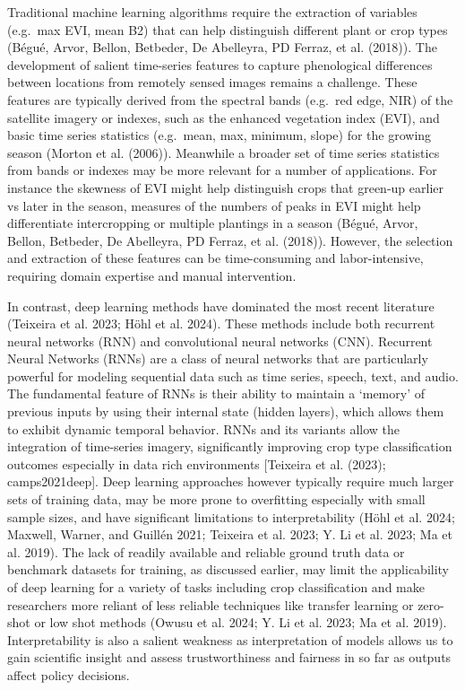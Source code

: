\documentclass[
]{article}
\begin{document}
Traditional machine learning algorithms require the extraction of
variables (e.g.~max EVI, mean B2) that can help distinguish different
plant or crop types (Bégué, Arvor, Bellon, Betbeder, De Abelleyra, PD
Ferraz, et al. (2018)). The development of salient time-series features
to capture phenological differences between locations from remotely
sensed images remains a challenge. These features are typically derived
from the spectral bands (e.g.~red edge, NIR) of the satellite imagery or
indexes, such as the enhanced vegetation index (EVI), and basic time
series statistics (e.g.~mean, max, minimum, slope) for the growing
season (Morton et al. (2006)). Meanwhile a broader set of time series
statistics from bands or indexes may be more relevant for a number of
applications. For instance the skewness of EVI might help distinguish
crops that green-up earlier vs later in the season, measures of the
numbers of peaks in EVI might help differentiate intercropping or
multiple plantings in a season (Bégué, Arvor, Bellon, Betbeder, De
Abelleyra, PD Ferraz, et al. (2018)). However, the selection and
extraction of these features can be time-consuming and labor-intensive,
requiring domain expertise and manual intervention.

In contrast, deep learning methods have dominated the most recent
literature (Teixeira et al. 2023; Höhl et al. 2024). These methods
include both recurrent neural networks (RNN) and convolutional neural
networks (CNN). Recurrent Neural Networks (RNNs) are a class of neural
networks that are particularly powerful for modeling sequential data
such as time series, speech, text, and audio. The fundamental feature of
RNNs is their ability to maintain a `memory' of previous inputs by using
their internal state (hidden layers), which allows them to exhibit
dynamic temporal behavior. RNNs and its variants allow the integration
of time-series imagery, significantly improving crop type classification
outcomes especially in data rich environments {[}Teixeira et al. (2023);
camps2021deep{]}. Deep learning approaches however typically require
much larger sets of training data, may be more prone to overfitting
especially with small sample sizes, and have significant limitations to
interpretability (Höhl et al. 2024; Maxwell, Warner, and Guillén 2021;
Teixeira et al. 2023; Y. Li et al. 2023; Ma et al. 2019). The lack of
readily available and reliable ground truth data or benchmark datasets
for training, as discussed earlier, may limit the applicability of deep
learning for a variety of tasks including crop classification and make
researchers more reliant of less reliable techniques like transfer
learning or zero-shot or low shot methods (Owusu et al. 2024; Y. Li et
al. 2023; Ma et al. 2019). Interpretability is also a salient weakness
as interpretation of models allows us to gain scientific insight and
assess trustworthiness and fairness in so far as outputs affect policy
decisions.
\end{document}
